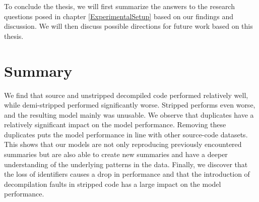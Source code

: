 To conclude the thesis, we will first summarize the answers to the research questions posed in chapter \ref{ExperimentalSetup} based on our findings and discussion. We will then discuss possible directions for future work based on this thesis. 
\section{Summary}
We find that source and unstripped decompiled code performed relatively well, while demi-stripped performed significantly worse. Stripped performs even worse, and the resulting model mainly was unusable. We observe that duplicates have a relatively significant impact on the model performance. Removing these duplicates puts the model performance in line with other source-code datasets. This shows that our models are not only reproducing previously encountered summaries but are also able to create new summaries and have a deeper understanding of the underlying patterns in the data. Finally, we discover that the loss of identifiers causes a drop in performance and that the introduction of decompilation faults in stripped code has a large impact on the model performance.

